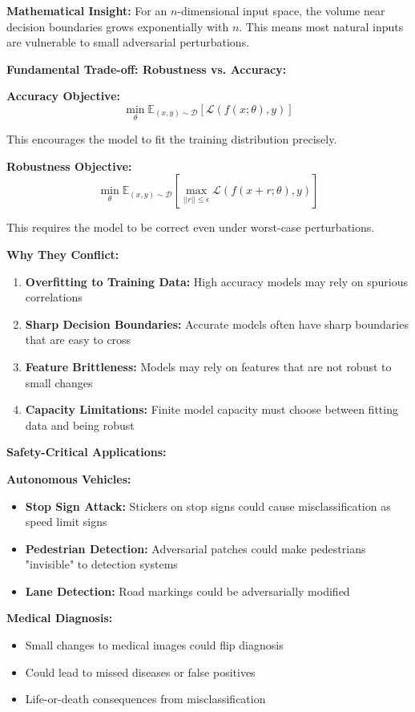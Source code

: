 \documentclass[12pt]{article}
\begin{document}
\begin{enumerate}[(a)]
{    \textbf{Mathematical Insight:}
    For an $n$-dimensional input space, the volume near decision boundaries grows exponentially with $n$. This means most natural inputs are vulnerable to small adversarial perturbations.
    
    \textbf{Fundamental Trade-off: Robustness vs. Accuracy:}
    
    \textbf{Accuracy Objective:}
    $$\min_\theta \mathbb{E}_{(x,y) \sim \mathcal{D}}[\mathcal{L}(f(x; \theta), y)]$$
    
    This encourages the model to fit the training distribution precisely.
    
    \textbf{Robustness Objective:}
    $$\min_\theta \mathbb{E}_{(x,y) \sim \mathcal{D}}\left[\max_{||r|| \leq \epsilon} \mathcal{L}(f(x + r; \theta), y)\right]$$
    
    This requires the model to be correct even under worst-case perturbations.
    
    \textbf{Why They Conflict:}
    
    \begin{enumerate}
        \item \textbf{Overfitting to Training Data:} High accuracy models may rely on spurious correlations
        \item \textbf{Sharp Decision Boundaries:} Accurate models often have sharp boundaries that are easy to cross
        \item \textbf{Feature Brittleness:} Models may rely on features that are not robust to small changes
        \item \textbf{Capacity Limitations:} Finite model capacity must choose between fitting data and being robust
    \end{enumerate}
    
    \textbf{Safety-Critical Applications:}
    
    \textbf{Autonomous Vehicles:}
    \begin{itemize}
        \item \textbf{Stop Sign Attack:} Stickers on stop signs could cause misclassification as speed limit signs
        \item \textbf{Pedestrian Detection:} Adversarial patches could make pedestrians "invisible" to detection systems
        \item \textbf{Lane Detection:} Road markings could be adversarially modified
    \end{itemize}
    
    \textbf{Medical Diagnosis:}
    \begin{itemize}
        \item Small changes to medical images could flip diagnosis
        \item Could lead to missed diseases or false positives
        \item Life-or-death consequences from misclassification
    \end{itemize}
    
}
\end{enumerate}
\end{document}
